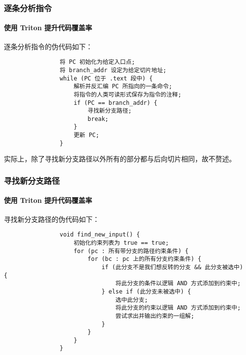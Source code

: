 \documentclass{ctexbeamer}
\begin{document}
    \begin{frame}[fragile]
        \frametitle{逐条分析指令}
        \framesubtitle{使用 Triton 提升代码覆盖率}
    
        逐条分析指令的伪代码如下：
        
        {
            \small
            \begin{verbatim}
                将 PC 初始化为给定入口点;
                将 branch_addr 设定为给定切片地址;
                while (PC 位于 .text 段中) {
                    解析并反汇编 PC 所指向的一条命令;
                    将指令的人类可读形式保存为指令的注释;
                    if (PC == branch_addr) {
                        寻找新分支路径;
                        break;
                    }
                    更新 PC;
                }
            \end{verbatim}
        }

        实际上，除了寻找新分支路径以外所有的部分都与后向切片相同，故不赘述。
    
    \end{frame}

    \begin{frame}[fragile]
        \frametitle{寻找新分支路径}
        \framesubtitle{使用 Triton 提升代码覆盖率}
    
        寻找新分支路径的伪代码如下：

        {
            \small
            \begin{verbatim}
                void find_new_input() {
                    初始化约束列表为 true == true;
                    for (pc : 所有带分支的路径约束条件) {
                        for (bc : pc 上的所有分支约束条件) {
                            if (此分支不是我们想反转的分支 && 此分支被选中) {
                                将此分支的条件以逻辑 AND 方式添加到约束中;
                            } else if (此分支未被选中) {
                                选中此分支;
                                将此分支的约束以逻辑 AND 方式添加到约束中;
                                尝试求出并输出约束的一组解;
                            }
                        }
                    }
                }
            \end{verbatim}
        }
    
    \end{frame}
\end{document}
